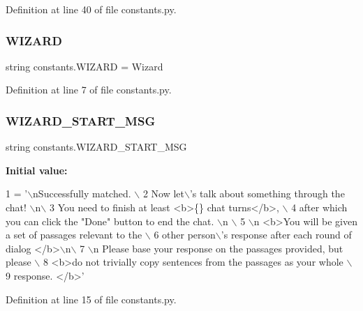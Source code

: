 Definition at line 40 of file constants.\+py.

\mbox{\label{namespaceconstants_ac1c110fe9f4ea6ca2603d3c131001c1e}} 
\subsubsection{\texorpdfstring{W\+I\+Z\+A\+RD}{WIZARD}}
{\footnotesize\ttfamily string constants.\+W\+I\+Z\+A\+RD = \textquotesingle{}Wizard\textquotesingle{}}



Definition at line 7 of file constants.\+py.

\mbox{\label{namespaceconstants_ab1d98a45649177ca56ea809e7625a270}} 
\subsubsection{\texorpdfstring{W\+I\+Z\+A\+R\+D\+\_\+\+S\+T\+A\+R\+T\+\_\+\+M\+SG}{WIZARD\_START\_MSG}}
{\footnotesize\ttfamily string constants.\+W\+I\+Z\+A\+R\+D\+\_\+\+S\+T\+A\+R\+T\+\_\+\+M\+SG}

{\bfseries Initial value\+:}
\begin{DoxyCode}
1 =  \textcolor{stringliteral}{'\(\backslash\)nSuccessfully matched. \(\backslash\)}
2 \textcolor{stringliteral}{        Now let\(\backslash\)'s talk about something through the chat! \(\backslash\)n\(\backslash\)}
3 \textcolor{stringliteral}{        You need to finish at least <b>\{\} chat turns</b>, \(\backslash\)}
4 \textcolor{stringliteral}{        after which you can click the "Done" button to end the chat. \(\backslash\)n \(\backslash\)}
5 \textcolor{stringliteral}{        \(\backslash\)n <b>You will be given a set of passages relevant to the \(\backslash\)}
6 \textcolor{stringliteral}{        other person\(\backslash\)'s response after each round of dialog </b>\(\backslash\)n\(\backslash\)}
7 \textcolor{stringliteral}{        \(\backslash\)n Please base your response on the passages provided, but please \(\backslash\)}
8 \textcolor{stringliteral}{        <b>do not trivially copy sentences from the passages as your whole \(\backslash\)}
9 \textcolor{stringliteral}{        response. </b>'}
\end{DoxyCode}


Definition at line 15 of file constants.\+py.

